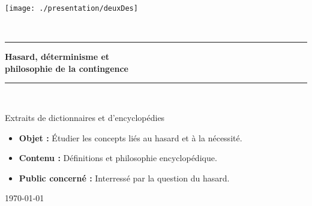 \begin{titlepage}
%
\newcommand{\HRule}{\rule{\linewidth}{0.5mm}}

\begin{center}
\texttt{[image: ./presentation/deuxDes]}
\end{center}

\textsc{\Large }\\[0.5cm]

\HRule

\begin{center}
{\huge \bfseries  Hasard, déterminisme et\\
philosophie de la contingence\\[0.4cm] }
\end{center}

\HRule \\[1.5cm]


\vfill

\hfill
\begin{minipage}{0.4\textwidth}
\begin{flushright} \large
Extraits de dictionnaires et d'encyclopédies
\end{flushright}
\end{minipage}

\vfill
{\sf \footnotesize
\begin{itemize}[leftmargin=1cm, label=, itemsep=1pt]
\item {\bf Objet : } Étudier les concepts liés au hasard et à la nécessité.
\item {\bf Contenu : } Définitions et philosophie encyclopédique.
\item {\bf Public concerné : } Interressé par la question du hasard.
\end{itemize}
}

\vfill

{\large \today}

\end{titlepage}
